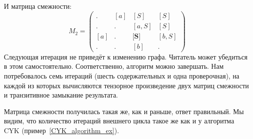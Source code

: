 \begin{example}
И матрица смежности:
\[ M_2 =
\begin{pmatrix}
. & [a] & [S] & [S] \\
. & . & [a, S] & [S] \\
[a] & . & \textbf{[S]} & [b,S] \\
. & . & [b] & .
\end{pmatrix}
\]
Следующая итерация не приведёт к изменению графа.
Читатель может убедиться в этом самостоятельно.
Соответственно, алгоритм можно завершать.
Нам потребовалось семь итераций (шесть содержательных и одна проверочная), на каждой из которых вычисляются тензорное произведение двух матриц смежности и транзитивное замыкание результата.

Матрица смежности получилась такая же, как и раньше, ответ правильный.
Мы видим, что количество итераций внешнего цикла такое же как и у алгоритма CYK (пример~\ref{CYK_algorithm_ex}).

\end{example}



